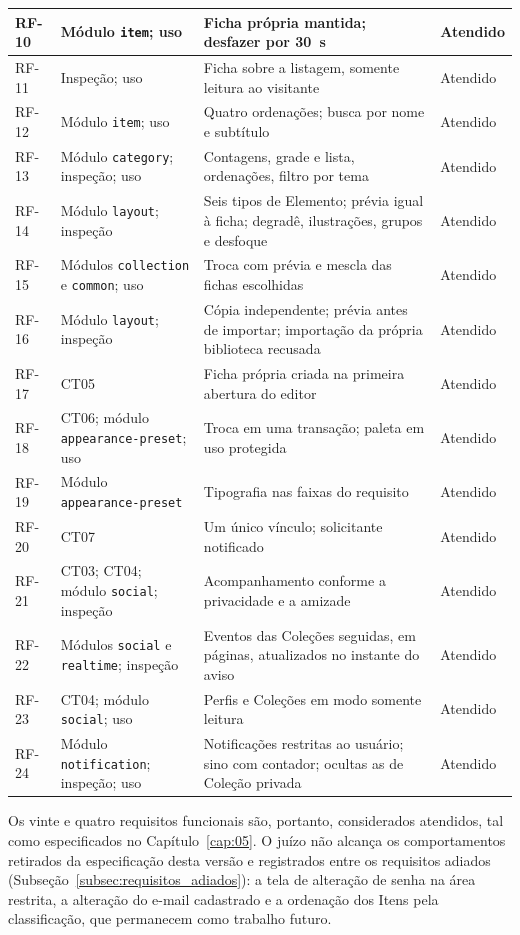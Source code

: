 \begin{longtable}{|p{1.3cm}|p{4.6cm}|p{5.6cm}|p{2.2cm}|}
RF-10 & Módulo \texttt{item}; uso & Ficha própria mantida; desfazer por 30~s & Atendido \\ \hline
RF-11 & Inspeção; uso & Ficha sobre a listagem, somente leitura ao visitante & Atendido \\ \hline
RF-12 & Módulo \texttt{item}; uso & Quatro ordenações; busca por nome e subtítulo & Atendido \\ \hline
RF-13 & Módulo \texttt{category}; inspeção; uso & Contagens, grade e lista, ordenações, filtro por tema & Atendido \\ \hline
RF-14 & Módulo \texttt{layout}; inspeção & Seis tipos de Elemento; prévia igual à ficha; degradê, ilustrações, grupos e desfoque & Atendido \\ \hline
RF-15 & Módulos \texttt{collection} e \texttt{common}; uso & Troca com prévia e mescla das fichas escolhidas & Atendido \\ \hline
RF-16 & Módulo \texttt{layout}; inspeção & Cópia independente; prévia antes de importar; importação da própria biblioteca recusada & Atendido \\ \hline
RF-17 & CT05 & Ficha própria criada na primeira abertura do editor & Atendido \\ \hline
RF-18 & CT06; módulo \texttt{appearance-preset}; uso & Troca em uma transação; paleta em uso protegida & Atendido \\ \hline
RF-19 & Módulo \texttt{appearance-preset} & Tipografia nas faixas do requisito & Atendido \\ \hline
RF-20 & CT07 & Um único vínculo; solicitante notificado & Atendido \\ \hline
RF-21 & CT03; CT04; módulo \texttt{social}; inspeção & Acompanhamento conforme a privacidade e a amizade & Atendido \\ \hline
RF-22 & Módulos \texttt{social} e \texttt{realtime}; inspeção & Eventos das Coleções seguidas, em páginas, atualizados no instante do aviso & Atendido \\ \hline
RF-23 & CT04; módulo \texttt{social}; uso & Perfis e Coleções em modo somente leitura & Atendido \\ \hline
RF-24 & Módulo \texttt{notification}; inspeção; uso & Notificações restritas ao usuário; sino com contador; ocultas as de Coleção privada & Atendido \\ \hline
\end{longtable}
\endgroup


Os vinte e quatro requisitos funcionais são, portanto, considerados atendidos, tal como especificados no Capítulo~\ref{cap:05}. O juízo não alcança
os comportamentos retirados da especificação desta versão e registrados entre os requisitos adiados (Subseção~\ref{subsec:requisitos_adiados}): a
tela de alteração de senha na área restrita, a alteração do e-mail cadastrado e a ordenação dos Itens pela classificação, que permanecem como trabalho
futuro.

